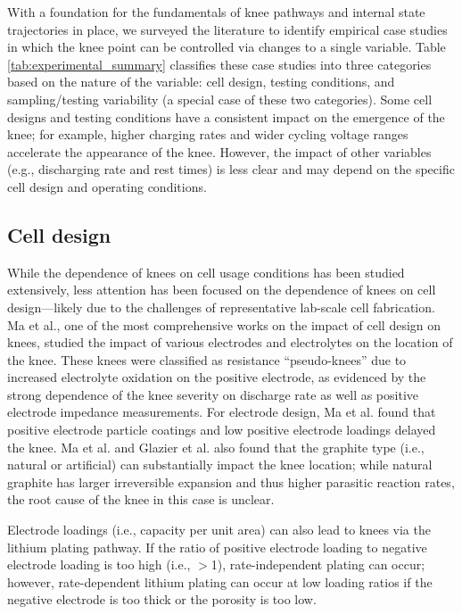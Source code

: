 \documentclass[journal=jpclcd,manuscript=article]{achemso}
\begin{document}
With a foundation for the fundamentals of knee pathways and internal state trajectories in place, we surveyed the literature to identify empirical case studies in which the knee point can be controlled via changes to a single variable. Table \ref{tab:experimental_summary} classifies these case studies into three categories based on the nature of the variable: cell design, testing conditions, and sampling/testing variability (a special case of these two categories). Some cell designs and testing conditions have a consistent impact on the emergence of the knee; for example, higher charging rates and wider cycling voltage ranges accelerate the appearance of the knee. However, the impact of other variables (e.g., discharging rate and rest times) is less clear and may depend on the specific cell design and operating conditions.

\subsection{Cell design}

While the dependence of knees on cell usage conditions has been studied extensively, less attention has been focused on the dependence of knees on cell design---likely due to the challenges of representative lab-scale cell fabrication. Ma et al.\cite{ma_editors_2019}, one of the most comprehensive works on the impact of cell design on knees, studied the impact of various electrodes and electrolytes on the location of the knee. These knees were classified as resistance ``pseudo-knees'' due to increased electrolyte oxidation on the positive electrode, as evidenced by the strong dependence of the knee severity on discharge rate as well as positive electrode impedance measurements. For electrode design, Ma et al.\cite{ma_editors_2019} found that positive electrode particle coatings and low positive electrode loadings delayed the knee. Ma et al. \cite{ma_editors_2019} and Glazier et al.\cite{glazier_analysis_2017} also found that the graphite type (i.e., natural or artificial) can substantially impact the knee location; while natural graphite has larger irreversible expansion and thus higher parasitic reaction rates\cite{glazier_analysis_2017}, the root cause of the knee in this case is unclear.

Electrode loadings (i.e., capacity per unit area) can also lead to knees via the lithium plating pathway.
If the ratio of positive electrode loading to negative electrode loading is too high (i.e., $>$1), rate-independent plating can occur\cite{deichmann_investigating_2020}; however, rate-dependent lithium plating can occur at low loading ratios if the negative electrode is too thick or the porosity is too low.\cite{waldmann_mechanical_2014, yang_modeling_2017}
\end{document}
